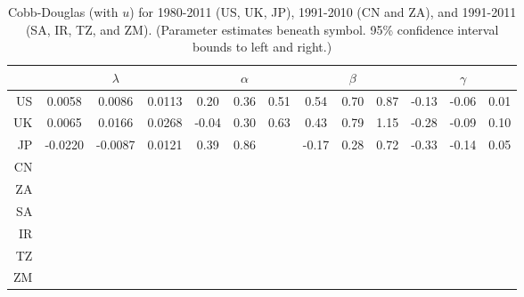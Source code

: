 \documentclass[preprint,authoryear,12pt]{elsarticle}\usepackage{graphicx, color}
\begin{document}
\begin{table}[H]
\begin{center}
\caption{Cobb-Douglas (with $u$) for 1980-2011 (US, UK, JP), 1991-2010 (CN and ZA), and 1991-2011 (SA, IR, TZ, and ZM). (Parameter estimates beneath symbol. 95\% confidence interval bounds to left and right.)}
\label{tab:CD_Parameters_With_U}
{\tiny
\begin{tabular}{r|ccc|ccc|ccc|ccc}
  \hline
 &   & $\lambda$ &   &   & $\alpha$ &   &   & $\beta$ &   &   & $\gamma$ &   \\ 
  \hline
US & 0.0058 & 0.0086 & 0.0113 & 0.20 & 0.36 & 0.51 & 0.54 & 0.70 & 0.87 & -0.13 & -0.06 & 0.01 \\ 
  UK & 0.0065 & 0.0166 & 0.0268 & -0.04 & 0.30 & 0.63 & 0.43 & 0.79 & 1.15 & -0.28 & -0.09 & 0.10 \\ 
  JP & -0.0220 & -0.0087 & 0.0121 & 0.39 & 0.86 &  & -0.17 & 0.28 & 0.72 & -0.33 & -0.14 & 0.05 \\ 
  CN &  &  &  &  &  &  &  &  &  &  &  &  \\ 
  ZA &  &  &  &  &  &  &  &  &  &  &  &  \\ 
  SA &  &  &  &  &  &  &  &  &  &  &  &  \\ 
  IR &  &  &  &  &  &  &  &  &  &  &  &  \\ 
  TZ &  &  &  &  &  &  &  &  &  &  &  &  \\ 
  ZM &  &  &  &  &  &  &  &  &  &  &  &  \\ 
   \hline
\end{tabular}
}
\end{center}
\end{table}
\end{document}
